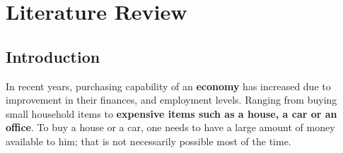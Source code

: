 %
%
%
%

\chapter{Literature Review}\label{C.LitReview}
\section{Introduction}\label{S.intro3}

In recent years, purchasing capability of an \textbf{economy} has increased due to improvement in their finances, and employment levels. Ranging from buying small household items to\textbf{ expensive items such as a house, a car or an office}. To buy a house or a car, one needs to have a large amount of money available to him; that is not necessarily possible most of the time. \\

